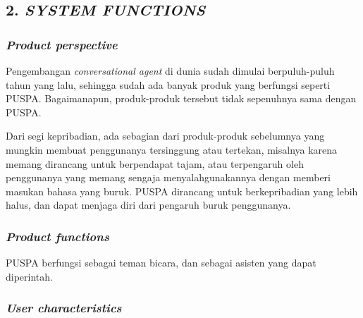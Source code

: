 \subsection*{\textcolor{subsectioncolor}{\textsf{2. \textit{SYSTEM FUNCTIONS}}}}


\subsubsection*{\textit{Product perspective}}

Pengembangan \textit{conversational agent} di dunia sudah dimulai berpuluh-puluh tahun yang lalu, sehingga sudah ada banyak produk yang berfungsi seperti PUSPA.
Bagaimanapun, produk-produk tersebut tidak sepenuhnya sama dengan PUSPA.


Dari segi kepribadian, ada sebagian dari produk-produk sebelumnya yang mungkin membuat penggunanya tersinggung atau tertekan, misalnya karena memang dirancang untuk berpendapat tajam, atau terpengaruh oleh penggunanya yang memang sengaja menyalahgunakannya dengan memberi masukan bahasa yang buruk.
PUSPA dirancang untuk berkepribadian yang lebih halus, dan dapat menjaga diri dari pengaruh buruk penggunanya.


\subsubsection*{\textit{Product functions}}

PUSPA berfungsi sebagai teman bicara, dan sebagai asisten yang dapat diperintah.


\subsubsection*{\textit{User characteristics}}

